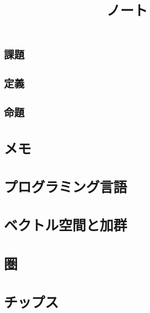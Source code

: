 \documentclass[5pt]{jreport}
\title{ノート}
\author{}
\begin{document}
\maketitle
\tableofcontents
\section*{課題}
\section*{定義}
\section*{命題}

\chapter{メモ}

%
%
%
%
%
%
%
%
%
%
%
%
%
%
%
%
%
%
%
%
%
\chapter{プログラミング言語}

%
%
%
%
%
%
%
%
\chapter{ベクトル空間と加群}

%
%
\chapter{圏}



%
%
%
%
%
%
\chapter{チップス}
%




\end{document}
